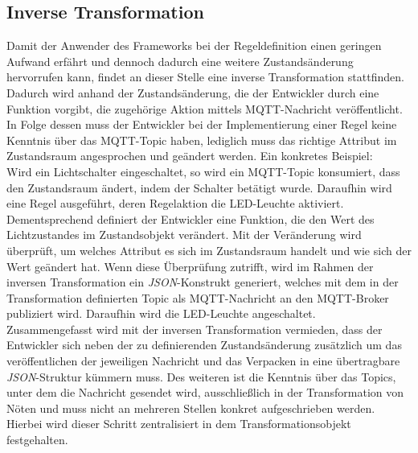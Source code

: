 \subsection{Inverse Transformation}
    Damit der Anwender des Frameworks bei der Regeldefinition einen geringen Aufwand erfährt und dennoch dadurch eine weitere 
    Zustandsänderung hervorrufen kann, findet an dieser Stelle eine inverse Transformation stattfinden. Dadurch wird anhand 
    der Zustandsänderung, die der Entwickler durch eine Funktion vorgibt, die zugehörige Aktion mittels \acs{MQTT}-Nachricht 
    veröffentlicht. In Folge dessen muss der Entwickler bei der Implementierung einer Regel keine Kenntnis über das 
    \acs{MQTT}-Topic haben, lediglich muss das richtige Attribut im Zustandsraum angesprochen und geändert werden. 
    Ein konkretes Beispiel: 
    \\
    \linebreak
    Wird ein Lichtschalter eingeschaltet, so wird ein \acs{MQTT}-Topic konsumiert, dass den Zustandsraum ändert, indem 
    der Schalter betätigt wurde. Daraufhin wird eine Regel ausgeführt, deren Regelaktion die LED-Leuchte aktiviert. 
    Dementsprechend definiert der Entwickler eine Funktion, die den Wert des Lichtzustandes im Zustandsobjekt verändert. 
    Mit der Veränderung wird überprüft, um welches Attribut es sich im Zustandsraum handelt und wie sich der Wert geändert hat. 
    Wenn diese Überprüfung zutrifft, wird im Rahmen der inversen Transformation ein \textit{JSON}-Konstrukt generiert, welches 
    mit dem in der Transformation definierten Topic als \acs{MQTT}-Nachricht an den \acs{MQTT}-Broker publiziert wird. 
    Daraufhin wird die LED-Leuchte angeschaltet. 
    \\
    \linebreak
    Zusammengefasst wird mit der inversen Transformation vermieden, dass der Entwickler sich neben der zu definierenden 
    Zustandsänderung zusätzlich um das veröffentlichen der jeweiligen Nachricht und das Verpacken in eine übertragbare 
    \textit{JSON}-Struktur kümmern muss. Des weiteren ist die Kenntnis über das Topics, unter dem die Nachricht 
    gesendet wird, ausschließlich in der Transformation von Nöten und muss nicht an mehreren Stellen konkret 
    aufgeschrieben werden. Hierbei wird dieser Schritt zentralisiert in dem Transformationsobjekt festgehalten. 
%

